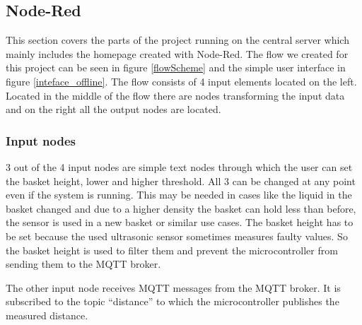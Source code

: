 \documentclass{article}
\begin{document}
\subsection{Node-Red}
This section covers the parts of the project running on the central server which
mainly includes the homepage created with Node-Red. The flow we created for this
project can be seen in figure \ref{flowScheme} and the simple user interface in
figure \ref{inteface_offline}. The flow consists of 4 input elements located on
the left. Located in the middle of the flow there are nodes transforming the
input data and on the right all the output nodes are located.\par
\subsubsection{Input nodes}
3 out of the 4 input nodes are simple text nodes through which the user can set
the basket height, lower and higher threshold. All 3 can be changed at any point
even if the system is running. This may be needed in cases like the liquid in
the basket changed and due to a higher density the basket can hold less than
before, the sensor is used in a new basket or similar use cases. The basket
height has to be set because the used ultrasonic sensor sometimes measures
faulty values. So the basket height is used to filter them and prevent the
microcontroller from sending them to the MQTT broker.\par
The other input node receives MQTT messages from the MQTT broker. It is
subscribed to the topic \enquote{distance} to which the microcontroller
publishes the measured distance.
\end{document}
